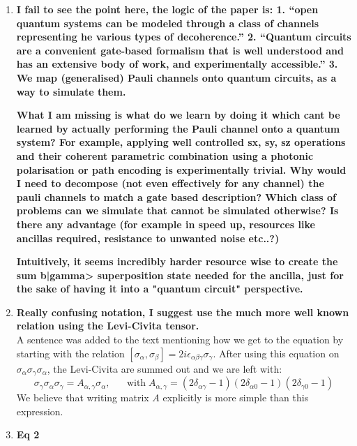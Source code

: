 \documentclass[10pt,letterpaper]{article} %
\begin{document}
\begin{enumerate}
\item \textbf{I fail to see the point here, the logic of the paper is: 
1. ``open quantum systems can be modeled through a class of channels representing he various types of decoherence.'' 2. ``Quantum circuits are a convenient gate-based formalism that is well understood and has an extensive body of work, and experimentally accessible.''
3. We map (generalised) Pauli channels onto quantum circuits, as a way to simulate them.} 

\textbf{What I am missing is what do we learn by doing it which cant be learned by actually performing the Pauli channel onto a quantum system? For example, applying well controlled sx, sy, sz operations and their coherent parametric combination using a photonic polarisation or path encoding is experimentally trivial. Why would I need to decompose (not even effectively for any channel) the pauli channels to match a gate based description? Which class of problems can we simulate that cannot be simulated otherwise? Is there any advantage (for example in speed up, resources like ancillas required, resistance to unwanted noise etc..?)}

\textbf{Intuitively, it seems incredibly harder resource wise to create the sum b|gamma> superposition state needed for the ancilla, just for the sake of having it into a "quantum circuit" perspective.}\\

\item \textbf{ Really confusing notation, I suggest use the much more well known relation using the Levi-Civita tensor.}\\


A sentence was added to the text mentioning how we get to the equation by starting with the relation $[\sigma_\alpha,\sigma_\beta] = 2 i
\epsilon_{\alpha \beta \gamma} \sigma_\gamma$.
After using this equation on $\sigma_{\alpha} \sigma_{\gamma} \sigma_{\alpha}$, the Levi-Civita are summed out and we are left with:
\begin{equation*}
\sigma_{\gamma} \sigma_{\alpha} \sigma_{\gamma}  =   A_{\alpha,\gamma} \sigma_{\alpha}, \;\;\;\;\;\; \text{with} \; A_{\alpha, \gamma} = (2\delta_{\alpha \gamma}-1)(2\delta_{\alpha 0}-1)(2\delta_{\gamma 0}-1)
\end{equation*}
We believe that writing matrix $A$ explicitly is more simple than this expression. 

\item \textbf{Eq 2} \\


\end{enumerate}
\end{document}
